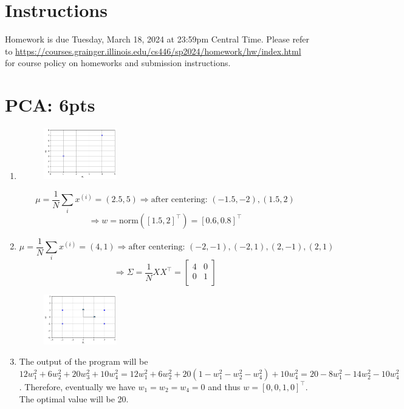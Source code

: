 \documentclass[12pt]{article}
\begin{document}
\singlespacing

\renewcommand{\familydefault}{\rmdefault}


\section{Instructions}

Homework is due Tuesday, March 18, 2024 at 23:59pm Central Time.
Please refer to \url{https://courses.grainger.illinois.edu/cs446/sp2024/homework/hw/index.html} for course policy on homeworks and submission instructions.

\section{PCA: 6pts}
\begin{enumerate}
    \item 
    \begin{figure} [!ht]
        \centering
        \includegraphics[width=0.3\textwidth]{1.1}
    \end{figure}
    \[\mu = \frac{1}{N}\sum_i x^{(i)} = (2.5, 5)\Rightarrow\text{after centering: }(-1.5, -2), (1.5, 2)\]
    \[\Rightarrow w = \text{norm}([1.5, 2]^{\top}) = [0.6, 0.8]^{\top}\]
    \item \[\mu = \frac{1}{N}\sum_i x^{(i)} = (4, 1)\Rightarrow\text{after centering: }(-2, -1), (-2, 1), (2, -1), (2, 1)\]
    \[\Rightarrow \Sigma = \frac{1}{N}XX^{\top} = 
    \begin{bmatrix}
        4 & 0\\
        0 & 1\\
    \end{bmatrix}\]
    \begin{figure} [!ht]
        \centering
        \includegraphics[width=0.3\textwidth]{1.2}
    \end{figure}
    \item The output of the program will be $12w_1^2 + 6w_2^2 + 20w_3^2 + 10w_4^2 = 12w_1^2 + 6w_2^2 + 20(1-w_1^2-w_2^2-w_4^2) + 10w_4^2 = 20 - 8w_1^2 - 14w_2^2 - 10w_4^2$. Therefore, eventually we have $w_1 = w_2 = w_4 = 0$ and thus $w = [0, 0, 1, 0]^{\top}$. The optimal value will be 20.
\end{enumerate}
\newpage
\end{document}
